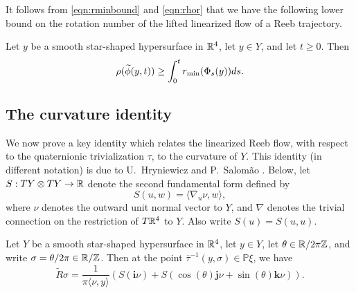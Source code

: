 It follows from \eqref{eqn:rminbound} and \eqref{eqn:rhor} that we have the following lower bound on the rotation number of the lifted linearized flow of a Reeb trajectory.

\begin{lemma}
\label{lem:minrot}
Let $y$ be a smooth star-shaped hypersurface in ${\mathbb R}^4$, let $y\in Y$, and let $t\ge 0$. Then
\[
\rho(\widetilde{\phi}(y,t)) \ge \int_0^tr_{\operatorname{min}}(\Phi_s(y))ds.
\]
\end{lemma}

\subsection{The curvature identity}

We now prove a key identity which relates the linearized Reeb flow, with respect to the quaternionic trivialization $\tau$, to the curvature of $Y$. This identity (in different notation) is due to U.\ Hryniewicz and P.\ Salom\~ao \cite{umberto}. Below, let $S:TY\otimes TY\to{\mathbb R}$ denote the second fundamental form defined by
\[
S(u,w) = \langle \nabla_u\nu,w\rangle,
\]
where $\nu$ denotes the outward unit normal vector to $Y$, and $\nabla$ denotes the trivial connection on the restriction of $T{\mathbb R}^4$ to $Y$. Also write $S(u)=S(u,u)$.

\begin{proposition}
\label{prop:uj}
Let $Y$ be a smooth star-shaped hypersurface in ${\mathbb R}^4$, let $y\in Y$, let $\theta\in{\mathbb R}/2\pi{\mathbb Z}$, and write $\sigma = \theta/2\pi\in{\mathbb R}/{\mathbb Z}$. Then at the point $\overline{\tau}^{-1}(y,\sigma)\in{\mathbb P}\xi$, we have
\begin{equation}
\label{eqn:curvatureidentity}
\widetilde{R}\sigma = \frac{1}{\pi\langle\nu,y\rangle}\left(S({\mathbf i}\nu) + S(\cos(\theta){\mathbf j}\nu + \sin(\theta){\mathbf k}\nu)\right).
\end{equation}
\end{proposition}

